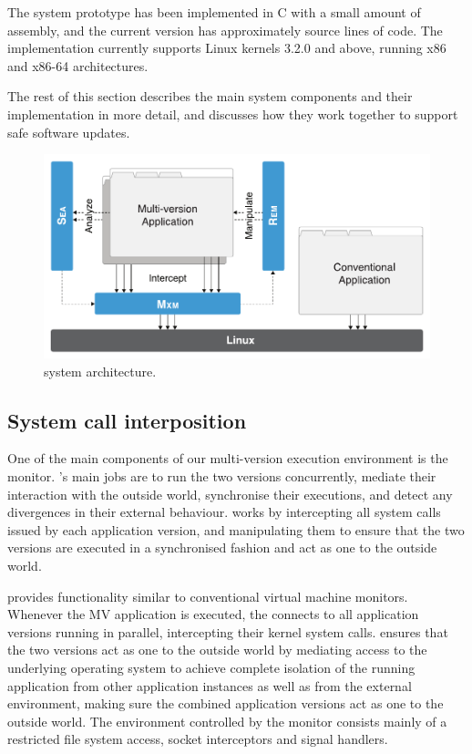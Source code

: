 The system prototype has been implemented in C with a small amount of
assembly, and the current version has approximately \mxSLOC source
lines of code. The implementation currently supports Linux kernels
3.2.0 and above, running x86 and x86-64 architectures.

The rest of this section describes the main \mx system components and
their implementation in more detail, and discusses how they work
together to support safe software updates.

\begin{figure}[t!]
\begin{center}
\includegraphics[width=\columnwidth]{safe-updates/figures/architecture}
\caption{\mx system architecture.  
}
\label{fig:design}
\end{center}
\end{figure}


\subsection{System call interposition}
\label{sec:mxm}

One of the main components of our multi-version execution environment
is the \mxm monitor.  \mxm's main jobs are to run the two versions
concurrently, mediate their interaction with the outside world,
synchronise their executions, and detect any divergences in their
external behaviour. \mxm works by intercepting all system calls issued
by each application version, and manipulating them to ensure that the
two versions are executed in a synchronised fashion and act as one to
the outside world.

\mxm provides functionality similar to conventional virtual machine
monitors.  Whenever the MV application is executed, the \mxm connects
to all application versions running in parallel, intercepting their
kernel system calls.  \mxm ensures that the two versions act as one to
the outside world by mediating access to the underlying operating
system to achieve complete isolation of the running application from
other application instances as well as from the external environment,
making sure the combined application versions act as one to the
outside world.  The environment controlled by the monitor consists
mainly of a restricted file system access, socket interceptors and
signal handlers.

